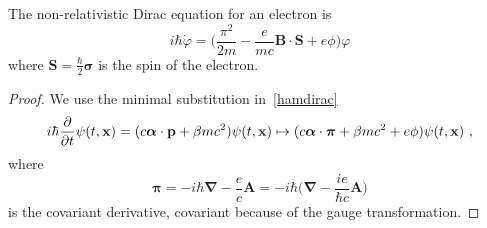     The non-relativistic Dirac equation for an electron is
    \begin{equation*}
        i \hbar \dot \varphi = \Big ( \frac{\pi^2}{2m} - \frac{e}{mc} \mathbf B \cdot \mathbf S + e \phi \Big) \varphi
    \end{equation*}
    where $\mathbf S = \frac{\hbar}{2} \boldsymbol \sigma$ is the spin of the electron.
    \begin{proof}
        We use the minimal substitution in~\eqref{hamdirac}
        \begin{equation*}
            i \hbar \frac{\partial}{\partial t} \psi(t, \mathbf x) = (c \boldsymbol \alpha \cdot \mathbf p + \beta m c^2) \psi(t, \mathbf x) \mapsto (c \boldsymbol \alpha \cdot \boldsymbol \pi + \beta m c^2 + e \phi) \psi(t, \mathbf x) ~,
        \end{equation*}
        where 
        \begin{equation*}
            \boldsymbol \pi = - i \hbar \boldsymbol \nabla - \frac{e}{c} \mathbf A = - i \hbar \Big ( \boldsymbol \nabla - \frac{ie}{\hbar c} \mathbf A \Big)
        \end{equation*}
        is the covariant derivative, covariant because of the gauge transformation.


\end{proof}
